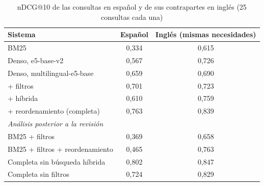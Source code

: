 \begin{table}[htbp!]
    \centering
    \caption{nDCG@10 de las consultas en español y de sus contrapartes en inglés (25 consultas cada una)}
    \label{tab:res-pe1-idioma}
    \begin{tabular}{|l|c|c|}
        \hline
        \textbf{Sistema} & \textbf{Español} & \textbf{Inglés (mismas necesidades)} \\
        \hline
        BM25 & 0{,}334 & 0{,}615 \\
        \hline
        Denso, e5-base-v2 & 0{,}567 & 0{,}726 \\
        \hline
        Denso, multilingual-e5-base & 0{,}659 & 0{,}690 \\
        \hline
        + filtros & 0{,}701 & 0{,}723 \\
        \hline
        + híbrida & 0{,}610 & 0{,}759 \\
        \hline
        + reordenamiento (completa) & 0{,}763 & 0{,}839 \\
        \hline
        \multicolumn{3}{|l|}{\textit{Análisis posterior a la revisión}} \\
        \hline
        BM25 + filtros & 0{,}369 & 0{,}658 \\
        \hline
        BM25 + filtros + reordenamiento & 0{,}465 & 0{,}763 \\
        \hline
        Completa sin búsqueda híbrida & 0{,}802 & 0{,}847 \\
        \hline
        Completa sin filtros & 0{,}724 & 0{,}829 \\
        \hline
    \end{tabular}
\end{table}
